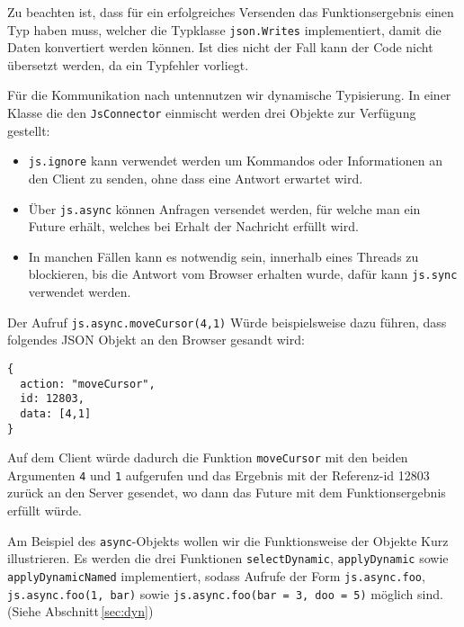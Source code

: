 Zu beachten ist, dass für ein erfolgreiches Versenden das Funktionsergebnis einen Typ haben muss,
welcher die Typklasse \texttt{json.Writes} implementiert, damit die Daten konvertiert werden können.
Ist dies nicht der Fall kann der Code nicht übersetzt werden, da ein Typfehler vorliegt.

Für die Kommunikation nach \glqq unten\grqq nutzen wir dynamische Typisierung. In einer Klasse die
den \texttt{JsConnector} einmischt werden drei Objekte zur Verfügung gestellt:

\begin{itemize}
  \item \texttt{js.ignore} kann verwendet werden um Kommandos oder Informationen an den Client zu 
  senden, ohne dass eine Antwort erwartet wird.
  \item Über \texttt{js.async} können Anfragen versendet werden, für welche man ein Future erhält, 
  welches bei Erhalt der Nachricht erfüllt wird.
  \item In manchen Fällen kann es notwendig sein, innerhalb eines Threads zu blockieren, bis die 
  Antwort vom Browser erhalten wurde, dafür kann \texttt{js.sync} verwendet werden.
\end{itemize}

Der Aufruf \texttt{js.async.moveCursor(4,1)} Würde beispielsweise dazu führen, dass folgendes JSON
Objekt an den Browser gesandt wird:

\begin{lstlisting}
{
  action: "moveCursor",
  id: 12803,
  data: [4,1]
}
\end{lstlisting}

Auf dem Client würde dadurch die Funktion \texttt{moveCursor} mit den beiden Argumenten \texttt{4}
und \texttt{1} aufgerufen und das Ergebnis mit der Referenz-id 12803 zurück an den Server gesendet,
wo dann das Future mit dem Funktionsergebnis erfüllt würde.

Am Beispiel des \texttt{async}-Objekts wollen wir die Funktionsweise der Objekte Kurz illustrieren.
Es werden die drei Funktionen \texttt{selectDynamic}, \texttt{applyDynamic} sowie
\texttt{applyDynamicNamed} implementiert, sodass Aufrufe der Form \texttt{js.async.foo},
\texttt{js.async.foo(1, bar)} sowie \texttt{js.async.foo(bar = 3, doo = 5)} möglich sind. (Siehe
Abschnitt\,\ref{sec:dyn})

